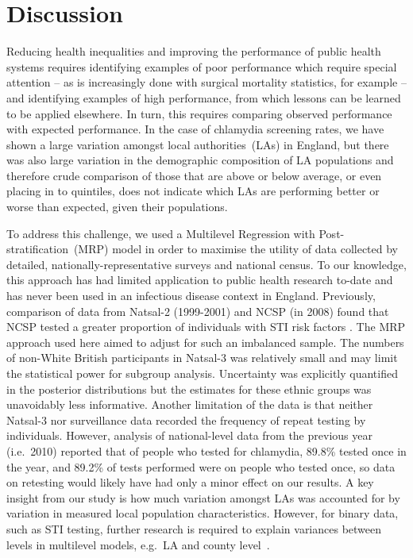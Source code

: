 \documentclass[fleqn,10pt]{wlscirep}
\begin{document}
\section*{Discussion}
Reducing health inequalities and improving the performance of public health systems requires identifying examples of poor performance which require special attention – as is increasingly done with surgical mortality statistics, for example – and identifying examples of high performance, from which lessons can be learned to be applied elsewhere. In turn, this requires comparing observed performance with expected performance. In the case of chlamydia screening rates, we have shown a large variation amongst local authorities~(LAs) in England, but there was also large variation in the demographic composition of LA populations and therefore crude comparison of those that are above or below average, or even placing in to quintiles, does not indicate which LAs are performing better or worse than expected, given their populations.

To address this challenge, we used a Multilevel Regression with Post-stratification~(MRP) model in order to maximise the utility of data collected by detailed, nationally-representative surveys and national census. To our knowledge, this approach has had limited application to public health research to-date \cite{Zhang2013, Wang2018} and has never been used in an infectious disease context in England. Previously, comparison of data from Natsal-2 (1999-2001) and NCSP (in 2008) found that NCSP tested a greater proportion of individuals with STI risk factors \cite{Riha2011}. The MRP approach used here aimed to adjust for such an imbalanced sample. The numbers of non-White British participants in Natsal-3 was relatively small and may limit the statistical power for subgroup analysis. Uncertainty was explicitly quantified in the posterior distributions but the estimates for these ethnic groups was unavoidably less informative. Another limitation of the data is that neither Natsal-3 nor surveillance data recorded the frequency of repeat testing by individuals. However, analysis of national-level data from the previous year (i.e.\ 2010) \cite{Woodhall2013} reported that of people who tested for chlamydia, 89.8\% tested once in the year, and 89.2\% of tests performed were on people who tested once, so data on retesting would likely have had only a minor effect on our results. A key insight from our study is how much variation amongst LAs was accounted for by variation in measured local population characteristics. However, for binary data, such as STI testing, further research is required to explain variances between levels in multilevel models, e.g.\ LA and county level~\cite{Gelman2006}.
\end{document}
